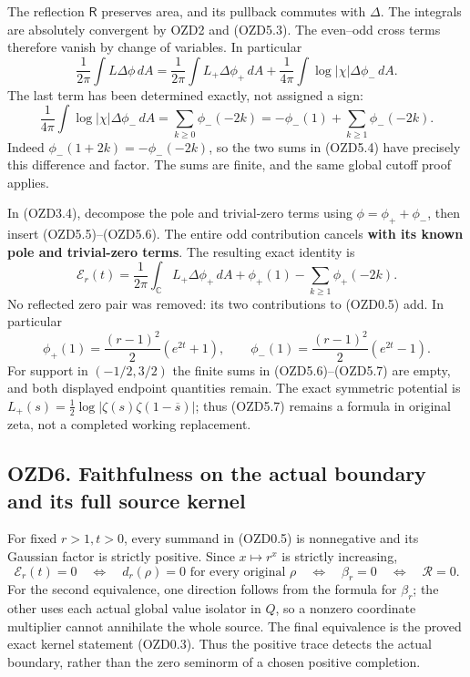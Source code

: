The reflection \(\mathsf R\) preserves area, and its pullback commutes
with \(\Delta\). The integrals are absolutely convergent by OZD2 and
(OZD5.3). The even--odd cross terms therefore vanish by change of
variables. In particular \[
\frac1{2\pi}\int L\Delta\phi\,dA
=\frac1{2\pi}\int L_+\Delta\phi_+\,dA
+\frac1{4\pi}\int\log|\chi|\Delta\phi_-\,dA.
\tag{OZD5.5}
\] The last term has been determined exactly, not assigned a sign: \[
\frac1{4\pi}\int\log|\chi|\Delta\phi_-\,dA
=\sum_{k\ge0}\phi_-(-2k)
=-\phi_-(1)+\sum_{k\ge1}\phi_-(-2k).
\tag{OZD5.6}
\] Indeed \(\phi_-(1+2k)=-\phi_-(-2k)\), so the two sums in (OZD5.4)
have precisely this difference and factor. The sums are finite, and the
same global cutoff proof applies.

In (OZD3.4), decompose the pole and trivial-zero terms using
\(\phi=\phi_++\phi_-\), then insert (OZD5.5)--(OZD5.6). The entire odd
contribution cancels \textbf{with its known pole and trivial-zero
terms}. The resulting exact identity is \[
\boxed{\mathcal E_r(t)=\frac1{2\pi}\int_{\mathbb C}L_+\Delta\phi_+\,dA
+\phi_+(1)-\sum_{k\ge1}\phi_+(-2k).}
\tag{OZD5.7}
\] No reflected zero pair was removed: its two contributions to (OZD0.5)
add. In particular \[
\phi_+(1)=\frac{(r-1)^2}{2}(e^{2t}+1),\qquad
\phi_-(1)=\frac{(r-1)^2}{2}(e^{2t}-1).
\tag{OZD5.8}
\] For support in \((-1/2,3/2)\) the finite sums in (OZD5.6)--(OZD5.7)
are empty, and both displayed endpoint quantities remain. The exact
symmetric potential is
\(L_+(s)=\tfrac12\log|\zeta(s)\zeta(1-\overline s)|\); thus (OZD5.7)
remains a formula in original zeta, not a completed working replacement.

\subsection{OZD6. Faithfulness on the actual boundary and its full
source
kernel}\label{ozd6.-faithfulness-on-the-actual-boundary-and-its-full-source-kernel}

For fixed \(r>1,t>0\), every summand in (OZD0.5) is nonnegative and its
Gaussian factor is strictly positive. Since \(x\mapsto r^x\) is strictly
increasing, \[
\mathcal E_r(t)=0
\quad\Longleftrightarrow\quad
d_r(\rho)=0\text{ for every original }\rho
\quad\Longleftrightarrow\quad\beta_r=0
\quad\Longleftrightarrow\quad\mathcal R=0.
\tag{OZD6.1}
\] For the second equivalence, one direction follows from the formula
for \(\beta_r\); the other uses each actual global value isolator in
\(Q\), so a nonzero coordinate multiplier cannot annihilate the whole
source. The final equivalence is the proved exact kernel statement
(OZD0.3). Thus the positive trace detects the actual boundary, rather
than the zero seminorm of a chosen positive completion.

